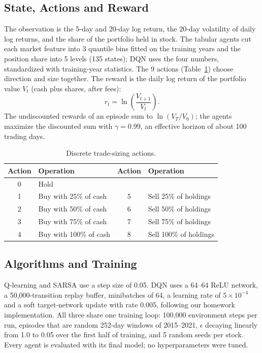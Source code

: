 \documentclass[11pt]{article}
\begin{document}
\subsection{State, Actions and Reward}
The observation is the 5-day and 20-day log return, the 20-day volatility
of daily log returns, and the share of the portfolio held in stock. The
tabular agents cut each market feature into 3 quantile bins fitted on the
training years and the position share into 5 levels (135 states); DQN uses
the four numbers, standardized with training-year statistics. The 9 actions
(Table~\ref{tab:actions}) choose direction and size together. The reward is
the daily log return of the portfolio value $V_t$ (cash plus shares, after
fees):
\begin{equation}
r_t = \ln\!\left(\frac{V_{t+1}}{V_t}\right).
\label{eq:reward}
\end{equation}
The undiscounted rewards of an episode sum to $\ln(V_T/V_0)$; the agents
maximize the discounted sum with $\gamma = 0.99$, an effective horizon of
about 100 trading days.

\begin{table}[t]
\centering
\caption{Discrete trade-sizing actions.}
\label{tab:actions}
\begin{tabular}{cl@{\hskip 2em}cl}
\toprule
Action & Operation & Action & Operation \\
\midrule
0 & Hold & & \\
1 & Buy with 25\% of cash & 5 & Sell 25\% of holdings \\
2 & Buy with 50\% of cash & 6 & Sell 50\% of holdings \\
3 & Buy with 75\% of cash & 7 & Sell 75\% of holdings \\
4 & Buy with 100\% of cash & 8 & Sell 100\% of holdings \\
\bottomrule
\end{tabular}
\end{table}

\subsection{Algorithms and Training}
Q-learning and SARSA use a step size of 0.05. DQN uses a 64--64 ReLU
network, a 50{,}000-transition replay buffer, minibatches of 64, a learning
rate of $5\times10^{-4}$ and a soft target-network update with rate 0.005,
following our homework implementation. All three share one training loop:
100{,}000 environment steps per run, episodes that are random 252-day windows
of 2015--2021, $\epsilon$ decaying linearly from 1.0 to 0.05 over the first
half of training, and 5 random seeds per stock. Every agent is evaluated
with its final model; no hyperparameters were tuned.
\end{document}
